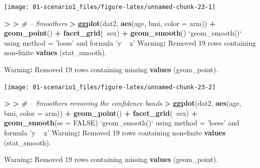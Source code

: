 \documentclass[
]{book}
\newenvironment{Shaded}{\begin{snugshade}}{\end{snugshade}}
\newcommand{\CommentTok}[1]{\textcolor[rgb]{0.56,0.35,0.01}{\textit{#1}}}
\newcommand{\DataTypeTok}[1]{\textcolor[rgb]{0.13,0.29,0.53}{#1}}
\newcommand{\DecValTok}[1]{\textcolor[rgb]{0.00,0.00,0.81}{#1}}
\newcommand{\ErrorTok}[1]{\textcolor[rgb]{0.64,0.00,0.00}{\textbf{#1}}}
\newcommand{\KeywordTok}[1]{\textcolor[rgb]{0.13,0.29,0.53}{\textbf{#1}}}
\newcommand{\NormalTok}[1]{#1}
\newcommand{\OperatorTok}[1]{\textcolor[rgb]{0.81,0.36,0.00}{\textbf{#1}}}
\newcommand{\OtherTok}[1]{\textcolor[rgb]{0.56,0.35,0.01}{#1}}
\newcommand{\StringTok}[1]{\textcolor[rgb]{0.31,0.60,0.02}{#1}}
\begin{document}
\begin{center}\texttt{[image: 01-scenario1\_files/figure-latex/unnamed-chunk-23-1]} \end{center}

\begin{Shaded}
\begin{Highlighting}[]
\OperatorTok{>}\StringTok{ }
\ErrorTok{>}\StringTok{ }\CommentTok{# -- Smoothers}
\ErrorTok{>}\StringTok{ }\KeywordTok{ggplot}\NormalTok{(dat2, }\KeywordTok{aes}\NormalTok{(age, bmi, }\DataTypeTok{color =}\NormalTok{ arm)) }\OperatorTok{+}\StringTok{ }\KeywordTok{geom_point}\NormalTok{() }\OperatorTok{+}\StringTok{ }\KeywordTok{facet_grid}\NormalTok{(}\OperatorTok{~}\NormalTok{sex) }\OperatorTok{+}\StringTok{ }\KeywordTok{geom_smooth}\NormalTok{()}
\StringTok{`}\DataTypeTok{geom_smooth()}\StringTok{`}\NormalTok{ using method =}\StringTok{ 'loess'}\NormalTok{ and formula }\StringTok{'y ~ x'}
\NormalTok{Warning}\OperatorTok{:}\StringTok{ }\NormalTok{Removed }\DecValTok{19}\NormalTok{ rows containing non}\OperatorTok{-}\NormalTok{finite }\KeywordTok{values}\NormalTok{ (stat_smooth).}

\NormalTok{Warning}\OperatorTok{:}\StringTok{ }\NormalTok{Removed }\DecValTok{19}\NormalTok{ rows containing missing }\KeywordTok{values}\NormalTok{ (geom_point).}
\end{Highlighting}
\end{Shaded}

\begin{center}\texttt{[image: 01-scenario1\_files/figure-latex/unnamed-chunk-23-2]} \end{center}

\begin{Shaded}
\begin{Highlighting}[]
\OperatorTok{>}\StringTok{ }
\ErrorTok{>}\StringTok{ }\CommentTok{# -- Smoothers removing the confidence bands}
\ErrorTok{>}\StringTok{ }\KeywordTok{ggplot}\NormalTok{(dat2, }\KeywordTok{aes}\NormalTok{(age, bmi, }\DataTypeTok{color =}\NormalTok{ arm)) }\OperatorTok{+}\StringTok{ }\KeywordTok{geom_point}\NormalTok{() }\OperatorTok{+}\StringTok{ }\KeywordTok{facet_grid}\NormalTok{(}\OperatorTok{~}\NormalTok{sex) }\OperatorTok{+}\StringTok{ }\KeywordTok{geom_smooth}\NormalTok{(}\DataTypeTok{se =} \OtherTok{FALSE}\NormalTok{)}
\StringTok{`}\DataTypeTok{geom_smooth()}\StringTok{`}\NormalTok{ using method =}\StringTok{ 'loess'}\NormalTok{ and formula }\StringTok{'y ~ x'}
\NormalTok{Warning}\OperatorTok{:}\StringTok{ }\NormalTok{Removed }\DecValTok{19}\NormalTok{ rows containing non}\OperatorTok{-}\NormalTok{finite }\KeywordTok{values}\NormalTok{ (stat_smooth).}

\NormalTok{Warning}\OperatorTok{:}\StringTok{ }\NormalTok{Removed }\DecValTok{19}\NormalTok{ rows containing missing }\KeywordTok{values}\NormalTok{ (geom_point).}
\end{Highlighting}
\end{Shaded}
\end{document}
